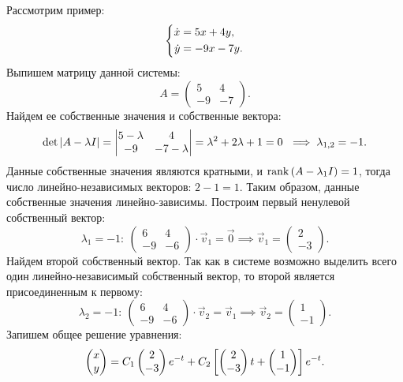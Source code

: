 		Рассмотрим пример:
		\[ \left\lbrace \begin{aligned} \dot{x} &= 5x + 4y,\\ \dot{y} &= -9x - 7y. \end{aligned} \right. \]
		Выпишем матрицу данной системы:
		\[ A = \begin{pmatrix} 5 & 4 \\ -9 & -7 \end{pmatrix}. \]
		Найдем ее собственные значения и собственные вектора:
		\[ \det\left\vert A - \lambda I \right\vert = \begin{vmatrix} 5 - \lambda & 4 \\ -9 & -7 - \lambda \end{vmatrix} = \lambda^2 + 2\lambda + 1 = 0 ~ \implies \lambda_{1, 2} = -1. \]
		Данные собственные значения являются кратными, и $\operatorname{rank}\left( A-\lambda_1 I \right) = 1$, тогда число линейно-независимых векторов: $2 - 1 = 1$. Таким образом, данные собственные значения линейно-зависимы. Построим первый ненулевой собственный вектор:
		\[ \lambda_1 = -1: ~ \begin{pmatrix} 6 & 4 \\ -9 & -6 \end{pmatrix} \cdot \vec{v}_1 = \vec{0} \implies \vec{v}_1 = \begin{pmatrix} 2 \\ -3 \end{pmatrix}. \]
		Найдем второй собственный вектор. Так как в системе возможно выделить всего один линейно-независимый собственный вектор, то второй является присоединенным к первому:
		\[ \lambda_2 = -1: ~ \begin{pmatrix} 6 & 4 \\ -9 & -6 \end{pmatrix} \cdot \vec{v}_2 = \vec{v}_1 \implies \vec{v}_2 = \begin{pmatrix} 1 \\ -1 \end{pmatrix}. \]
		Запишем общее решение уравнения:
		\[ \begin{pmatrix} x \\ y \end{pmatrix} = C_1 \begin{pmatrix} 2 \\ -3 \end{pmatrix} e^{-t} + C_2 \left[ \begin{pmatrix} 2 \\ -3 \end{pmatrix} t + \begin{pmatrix} 1 \\ -1 \end{pmatrix} \right] e^{-t}. \]

